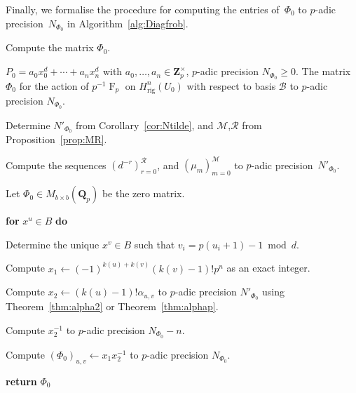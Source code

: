 \documentclass[a4paper,11pt]{article}
\numberwithin{equation}{section}
\newcommand{\ZZ}{\mathbf{Z}} %
\newcommand{\QQ}{\mathbf{Q}} %
\DeclareMathOperator{\Frob}{F}           %
\providecommand{\Hrig}{H_{\text{rig}}}  %
\providecommand{\cB}{\mathcal{B}} %
\theoremstyle{definition}
\begin{document}
Finally, we formalise the procedure for computing 
the entries of~$\Phi_0$ to $p$-adic precision~$N_{\Phi_0}$ in 
Algorithm~\ref{alg:Diagfrob}.

\begin{algorithm}
\caption{Compute the matrix $\Phi_0$.}
\label{alg:Diagfrob}
\begin{algorithmic}
\vspace{1mm}
\Require $P_0=a_0 x_0^d + \dotsb + a_n x_n^d$ 
         with $a_0,\dotsc,a_n \in \ZZ_p^{\times}$, 
         $p$-adic precision $N_{\Phi_0} \geq 0$.
\Ensure  The matrix $\Phi_0$ for the action of $p^{-1} \Frob_p$ 
         on $\Hrig^n(U_0)$ with respect to basis $\cB$ to $p$-adic 
         precision $N_{\Phi_0}$.
\State \begin{compactenum}[{\hspace{1em}} 1.] \vspace{-1.24em}
\item Determine $N'_{\Phi_0}$ from Corollary~\ref{cor:Ntilde}, and 
      $\mathcal{M}$,$\mathcal{R}$ from Proposition~\ref{prop:MR}. 
\item Compute the sequences $(d^{-r})_{r=0}^{\mathcal{R}}$, and 
      $(\mu_{m})_{m=0}^{\mathcal{M}}$ to $p$-adic precision~$N'_{\Phi_0}$.
\item Let $\Phi_0 \in M_{b \times b}(\QQ_p)$ be the zero matrix.
\item[] \textbf{for} $x^u \in B$ \textbf{do} 
\item[] \begin{compactenum}[{\hspace{1em}} 1.]
        \item Determine the unique $x^v \in B$ such that $v_i = p (u_i + 1) - 1 \bmod{d}$.
        \item Compute $x_1 \gets (-1)^{k(u)+k(v)} (k(v)-1)! p^n$ as an exact integer.
        \item Compute $x_2 \gets (k(u) - 1)! \alpha_{u,v}$ to $p$-adic 
              precision $N'_{\Phi_0}$ using Theorem~\ref{thm:alpha2} or 
              Theorem~\ref{thm:alphap}.
        \item Compute $x_2^{-1}$ to $p$-adic precision $N_{\Phi_0}-n$.
        \item Compute $(\Phi_0)_{u,v} \gets x_1 x_2^{-1}$ to $p$-adic precision $N_{\Phi_0}$.
      \end{compactenum}   
 \item \textbf{return} $\Phi_0$      
\end{compactenum}
\EndProcedure
\end{algorithmic}
\end{algorithm}
\end{document}
